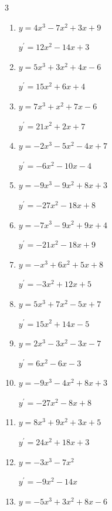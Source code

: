 \begin{multicols}{3}
\begin{enumerate}
        $\displaystyle y^{\prime}=-6x^{2}-16x+2$

  \item $y=4x^{3}-7x^{2}+3x+9$

        $\displaystyle y^{\prime}=12x^{2}-14x+3$

\columnbreak %

  \item $y=5x^{3}+3x^{2}+4x-6$

        $\displaystyle y^{\prime}=15x^{2}+6x+4$

  \item $y=7x^{3}+x^{2}+7x-6$

        $\displaystyle y^{\prime}=21x^{2}+2x+7$

  \item $y=-2x^{3}-5x^{2}-4x+7$

        $\displaystyle y^{\prime}=-6x^{2}-10x-4$

  \item $y=-9x^{3}-9x^{2}+8x+3$

        $\displaystyle y^{\prime}=-27x^{2}-18x+8$

  \item $y=-7x^{3}-9x^{2}+9x+4$

        $\displaystyle y^{\prime}=-21x^{2}-18x+9$

  \item $y=-x^{3}+6x^{2}+5x+8$

        $\displaystyle y^{\prime}=-3x^{2}+12x+5$

  \item $y=5x^{3}+7x^{2}-5x+7$

        $\displaystyle y^{\prime}=15x^{2}+14x-5$

  \item $y=2x^{3}-3x^{2}-3x-7$

        $\displaystyle y^{\prime}=6x^{2}-6x-3$

  \item $y=-9x^{3}-4x^{2}+8x+3$

        $\displaystyle y^{\prime}=-27x^{2}-8x+8$

  \item $y=8x^{3}+9x^{2}+3x+5$

        $\displaystyle y^{\prime}=24x^{2}+18x+3$

  \item $y=-3x^{3}-7x^{2}$

        $\displaystyle y^{\prime}=-9x^{2}-14x$

  \item $y=-5x^{3}+3x^{2}+8x-6$


\end{enumerate}
\end{multicols}
